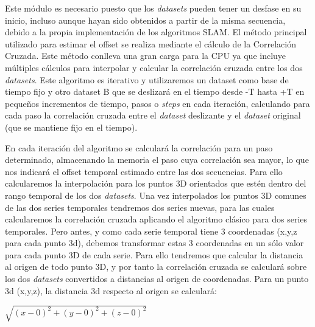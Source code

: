 Este módulo es necesario puesto que los \textit{datasets} pueden tener un desfase en su inicio, incluso aunque hayan sido obtenidos a partir de la misma secuencia, debido a la propia implementación de los algoritmos SLAM. El método principal utilizado para estimar el offset se realiza mediante el cálculo de la Correlación Cruzada. 
Este método conlleva una gran carga para la CPU ya que incluye múltiples cálculos para interpolar y calcular la correlación cruzada entre los dos \textit{datasets}. Este algoritmo es iterativo y utilizaremos un dataset como base de tiempo fijo y otro dataset B que se deslizará en el tiempo desde -T hasta +T en pequeños incrementos de tiempo, pasos o \textit{steps} en cada iteración, calculando para cada paso la correlación cruzada entre el \textit{dataset} deslizante y el \textit{dataset} original (que se mantiene fijo en el tiempo).

En cada iteración del algoritmo se calculará la correlación para un paso determinado, almacenando la memoria el paso cuya correlación sea mayor, lo que nos indicará el offset temporal estimado entre las dos secuencias. Para ello calcularemos la interpolación para los puntos 3D orientados que estén dentro del rango temporal de los dos \textit{datasets}. Una vez interpolados los puntos 3D comunes de las dos series temporales tendremos dos series nuevas, para las cuales calcularemos la correlación cruzada aplicando el algoritmo clásico para dos series temporales. Pero antes, y como cada serie temporal tiene 3 coordenadas (x,y,z para cada punto 3d), debemos transformar estas 3 coordenadas en un sólo valor para cada punto 3D de cada serie. Para ello tendremos que calcular la distancia al origen de todo punto 3D, y por tanto la correlación cruzada se calculará sobre los dos \textit{datasets} convertidos a distancias al origen de coordenadas.
Para un punto 3d (x,y,z), la distancia 3d respecto al origen se calculará:
\begin{center}
	\begin{math}
	\sqrt{(x-0)^2 +(y-0)^2+(z-0)^2}
	\end{math}
\end{center}

